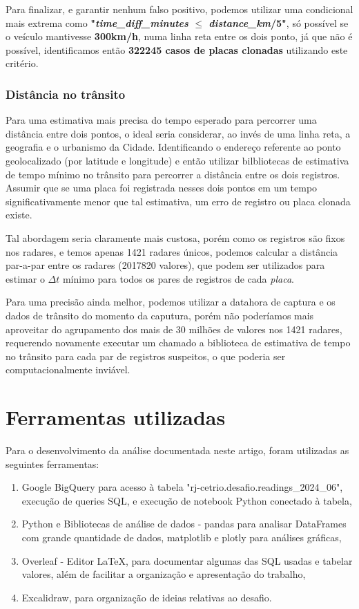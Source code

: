 \documentclass{article}
\begin{document}
Para finalizar, e garantir nenhum falso positivo, podemos utilizar uma condicional mais extrema como \textbf{"\textit{time\_diff\_minutes} $ \leq $ \textit{distance\_km}/5"}, só possível se o veículo mantivesse \textbf{300km/h}, numa linha reta entre os dois ponto, já que não é possível, identificamos então \textbf{322245 casos de placas clonadas} utilizando este critério.

\subsubsection{Distância no trânsito}

Para uma estimativa mais precisa do tempo esperado para percorrer uma distância entre dois pontos, o ideal seria considerar, ao invés de uma linha reta, a geografia e o urbanismo da Cidade. Identificando o endereço referente ao ponto geolocalizado (por latitude e longitude) e então utilizar bilbliotecas de estimativa de tempo mínimo no trânsito para percorrer a distância entre os dois registros. Assumir que se uma placa foi registrada nesses dois pontos em um tempo significativamente menor que tal estimativa, um erro de registro ou placa clonada existe.

Tal abordagem seria claramente mais custosa, porém como os registros são fixos nos radares, e temos apenas 1421 radares únicos, podemos calcular a distância par-a-par entre os radares (2017820 valores), que podem ser utilizados para estimar o $\Delta t$ mínimo para todos os pares de registros de cada \textit{placa}.

Para uma precisão ainda melhor, podemos utilizar a datahora de captura e os dados de trânsito do momento da caputura, porém não poderíamos mais aproveitar do agrupamento dos mais de 30 milhões de valores nos 1421 radares, requerendo novamente executar um chamado a biblioteca de estimativa de tempo no trânsito para cada par de registros suspeitos, o que poderia ser computacionalmente inviável.

\section{Ferramentas utilizadas}

Para o desenvolvimento da análise documentada neste artigo, foram utilizadas as seguintes ferramentas:

\begin{enumerate}
\item Google BigQuery para acesso à tabela "rj-cetrio.desafio.readings\_2024\_06", execução de queries SQL, e execução de notebook Python conectado à tabela,
\item Python e Bibliotecas de análise de dados - pandas para analisar DataFrames com grande quantidade de dados, matplotlib e plotly para análises gráficas,
\item Overleaf - Editor LaTeX, para documentar algumas das SQL usadas e tabelar valores, além de facilitar a organização e apresentação do trabalho,
\item Excalidraw, para organização de ideias relativas ao desafio.
\end{enumerate}
\end{document}
